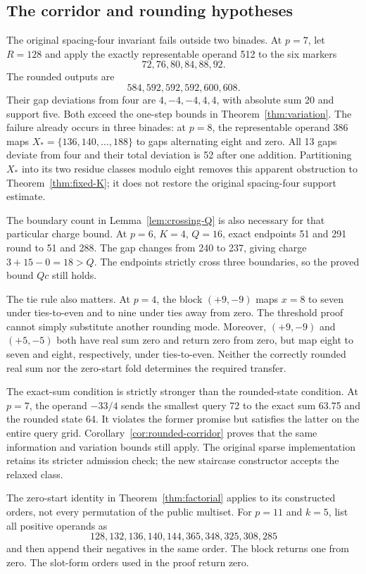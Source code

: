 \documentclass[11pt,reqno]{amsart}
\theoremstyle{definition}
\theoremstyle{remark}
\numberwithin{equation}{section}
\begin{document}
\subsection{The corridor and rounding hypotheses}

The original spacing-four invariant fails outside two binades. At $p=7$,
let $R=128$ and apply the exactly representable operand 512 to the six markers
\[
 72,76,80,84,88,92.
\]
The rounded outputs are
\[
 584,592,592,592,600,608.
\]
Their gap deviations from four are $4,-4,-4,4,4$, with absolute sum 20 and
support five. Both exceed the one-step bounds in
Theorem~\ref{thm:variation}. The failure already occurs in three binades:
at $p=8$, the representable operand 386 maps $X_\ast=\{136,140,\ldots,188\}$
to gaps alternating eight and zero. All 13 gaps deviate from four and their
total deviation is 52 after one addition. Partitioning $X_\ast$ into its
two residue classes modulo eight removes this apparent obstruction to
Theorem~\ref{thm:fixed-K}; it does not restore the original spacing-four
support estimate.

The boundary count in Lemma~\ref{lem:crossing-Q} is also necessary for that
particular charge bound. At $p=6$, $K=4$, $Q=16$, exact endpoints 51 and
291 round to 51 and 288. The gap changes from 240 to 237, giving charge
$3+15-0=18>Q$. The endpoints strictly cross three boundaries, so the
proved bound $Qc$ still holds.

The tie rule also matters. At $p=4$, the block $(+9,-9)$ maps $x=8$ to seven
under ties-to-even and to nine under ties away from zero. The threshold proof
cannot simply substitute another rounding mode. Moreover, $(+9,-9)$ and
$(+5,-5)$ both have real sum zero and return zero from zero, but map eight to
seven and eight, respectively, under ties-to-even. Neither the correctly
rounded real sum nor the zero-start fold determines the required transfer.

The exact-sum condition is strictly stronger than the rounded-state
condition. At $p=7$, the operand $-33/4$ sends the smallest query 72 to
the exact sum 63.75 and the rounded state 64. It violates the former
promise but satisfies the latter on the entire query grid.
Corollary~\ref{cor:rounded-corridor} proves that the same information and
variation bounds still apply. The original sparse implementation retains
its stricter admission check; the new staircase constructor accepts the
relaxed class.

The zero-start identity in Theorem~\ref{thm:factorial} applies to its
constructed orders, not every permutation of the public multiset. For
$p=11$ and $k=5$, list all positive operands as
\[
 128,132,136,140,144,365,348,325,308,285
\]
and then append their negatives in the same order. The block returns one
from zero. The slot-form orders used in the proof return zero.
\end{document}
